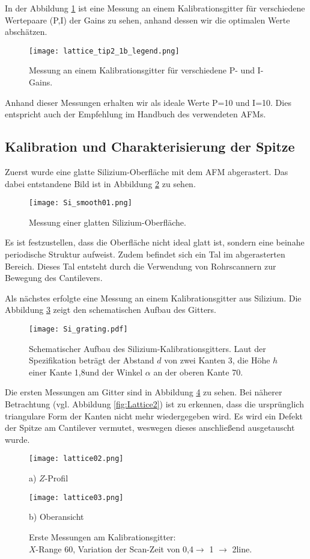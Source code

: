 In der Abbildung \ref{fig:gain} ist eine Messung an einem Kalibrationsgitter für verschiedene Wertepaare (P,I) der Gains zu sehen, anhand dessen wir die optimalen Werte abschätzen.
\begin{figure}[h]
	\centering
	\texttt{[image: lattice\_tip2\_1b\_legend.png]}
	\caption[Bestimmung des P- und I-Gains]{Messung an einem Kalibrationsgitter für verschiedene P- und I-Gains.}
\label{fig:gain}
\end{figure}
Anhand dieser Messungen erhalten wir als ideale Werte P=10 und I=10. Dies entspricht auch der Empfehlung im Handbuch des verwendeten AFMs.
\subsection{Kalibration und Charakterisierung der Spitze}
Zuerst wurde eine glatte Silizium-Oberfläche mit dem AFM abgerastert. Das dabei entstandene Bild ist in Abbildung \ref{fig:Si_smooth01} zu sehen.
\begin{figure}[h]
	\centering
	\texttt{[image: Si\_smooth01.png]}
	\caption{Messung einer glatten Silizium-Oberfläche.}
	\label{fig:Si_smooth01}
\end{figure}
Es ist festzustellen, dass die Oberfläche nicht ideal glatt ist, sondern eine beinahe periodische Struktur aufweist. Zudem befindet sich ein Tal im abgerasterten Bereich. Dieses Tal entsteht durch die Verwendung von Rohrscannern zur Bewegung des Cantilevers.

Als nächstes erfolgte eine Messung an einem Kalibrationsgitter aus Silizium. Die Abbildung \ref{fig:Si_grating} zeigt den schematischen Aufbau des Gitters.
\begin{figure}[H]
	\centering
	\texttt{[image: Si\_grating.pdf]}
	\caption[Schematischer Aufbau des Silizium-Kalibrationsgitters]{Schematischer Aufbau des Silizium-Kalibrationsgitters. Laut der Spezifikation beträgt der Abstand $d$ von zwei Kanten 3\micro\metre, die Höhe $h$ einer Kante 1,8\micro\metre und der Winkel $\alpha$ an der oberen Kante 70\degree.}
	\label{fig:Si_grating}
\end{figure}
Die ersten Messungen am Gitter sind in Abbildung \ref{fig:Lattice1} zu sehen. Bei näherer Betrachtung (vgl. Abbildung \ref{fig:Lattice2}) ist zu erkennen, dass die ursprünglich triangulare Form der Kanten nicht mehr wiedergegeben wird. Es wird ein Defekt der Spitze am Cantilever vermutet, weswegen dieses anschließend ausgetauscht wurde.
\begin{figure}[H]
	\centering
\begin{minipage}{0.45\textwidth}
\centering
		\texttt{[image: lattice02.png]}
		\caption*{a) $Z$-Profil}
	\end{minipage}
	\hfill
\begin{minipage}{0.45\textwidth}
\centering
		\texttt{[image: lattice03.png]}
		\caption*{b) Oberansicht}
	\end{minipage}
	\caption[Erste Messungen am Kalibrationsgitter]{Erste Messungen am Kalibrationsgitter:\\ $X$-Range 60\micro\metre,  Variation der Scan-Zeit von 0,4$\rightarrow$ 1 $\rightarrow$ 2\second\per line.}
	\label{fig:Lattice1}
\end{figure}

